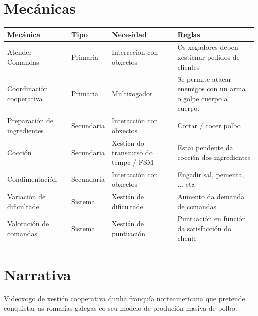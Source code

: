 \documentclass{report}  %
\begin{document}
\clearpage


\section{Mecánicas}

\begin{table}[h]
    \centering
    \renewcommand{\arraystretch}{1.3} %
    \setlength{\tabcolsep}{10pt} %
    \label{tab:mecanicas}
    \begin{tabular}{|p{4cm}|p{2cm}|p{3cm}|p{4cm}|}
        \hline
        \rowcolor{octopus} %
        \textbf{Mecánica}  & \textbf{Tipo} & \textbf{Necesidad} & \textbf{Reglas} \\
        \hline
        Atender Comandas & Primaria  & Interaccion con obxectos  & Os xogadores deben xestionar pedidos de clientes \\
        \hline
        Coordinación cooperativa & Primaria  & Multixogador    & Se permite atacar enemigos con un arma o golpe cuerpo a cuerpo. \\
        \hline
        Preparación de ingredientes  & Secundaria & Interacción con obxectos & Cortar / cocer polbo \\
        \hline
        Cocción & Secundaria & Xestión do transcurso do tempo / FSM & Estar pendente da cocción dos ingredientes \\
        \hline
        Condimentación & Secundaria & Interacción con obxectos & Engadir sal, pementa, ... etc. \\
        \hline
        Variación de dificultade  & Sistema & Xestión de dificultade & Aumento da demanda de comandas \\
        \hline
        Valoración de comandas & Sistema & Xestión de puntuación & Puntuación en función da satisfacción do cliente \\
        \hline

    \end{tabular}
\end{table}

\newpage
\section{Narrativa}

Videoxogo de xestión cooperativa dunha franquía norteamericana que pretende conquistar as romarías galegas co seu modelo de produción masiva de polbo.
\end{document}
